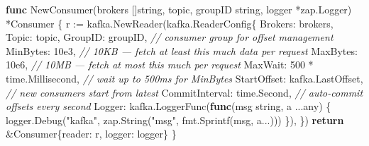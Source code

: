 \documentclass[
]{article}
\newenvironment{Shaded}{}{}
\newcommand{\CommentTok}[1]{\textcolor[rgb]{0.38,0.63,0.69}{\textit{#1}}}
\newcommand{\ControlFlowTok}[1]{\textcolor[rgb]{0.00,0.44,0.13}{\textbf{#1}}}
\newcommand{\DataTypeTok}[1]{\textcolor[rgb]{0.56,0.13,0.00}{#1}}
\newcommand{\DecValTok}[1]{\textcolor[rgb]{0.25,0.63,0.44}{#1}}
\newcommand{\FloatTok}[1]{\textcolor[rgb]{0.25,0.63,0.44}{#1}}
\newcommand{\KeywordTok}[1]{\textcolor[rgb]{0.00,0.44,0.13}{\textbf{#1}}}
\newcommand{\NormalTok}[1]{#1}
\newcommand{\OperatorTok}[1]{\textcolor[rgb]{0.40,0.40,0.40}{#1}}
\newcommand{\StringTok}[1]{\textcolor[rgb]{0.25,0.44,0.63}{#1}}
\begin{document}
\begin{Shaded}
\begin{Highlighting}[]
\KeywordTok{func}\NormalTok{ NewConsumer}\OperatorTok{(}\NormalTok{brokers }\OperatorTok{[]}\DataTypeTok{string}\OperatorTok{,}\NormalTok{ topic}\OperatorTok{,}\NormalTok{ groupID }\DataTypeTok{string}\OperatorTok{,}\NormalTok{ logger }\OperatorTok{*}\NormalTok{zap}\OperatorTok{.}\NormalTok{Logger}\OperatorTok{)} \OperatorTok{*}\NormalTok{Consumer }\OperatorTok{\{}
\NormalTok{    r }\OperatorTok{:=}\NormalTok{ kafka}\OperatorTok{.}\NormalTok{NewReader}\OperatorTok{(}\NormalTok{kafka}\OperatorTok{.}\NormalTok{ReaderConfig}\OperatorTok{\{}
\NormalTok{        Brokers}\OperatorTok{:}\NormalTok{     brokers}\OperatorTok{,}
\NormalTok{        Topic}\OperatorTok{:}\NormalTok{       topic}\OperatorTok{,}
\NormalTok{        GroupID}\OperatorTok{:}\NormalTok{     groupID}\OperatorTok{,}   \CommentTok{// consumer group for offset management}
\NormalTok{        MinBytes}\OperatorTok{:}    \FloatTok{10e3}\OperatorTok{,}      \CommentTok{// 10KB — fetch at least this much data per request}
\NormalTok{        MaxBytes}\OperatorTok{:}    \FloatTok{10e6}\OperatorTok{,}      \CommentTok{// 10MB — fetch at most this much per request}
\NormalTok{        MaxWait}\OperatorTok{:}     \DecValTok{500} \OperatorTok{*}\NormalTok{ time}\OperatorTok{.}\NormalTok{Millisecond}\OperatorTok{,} \CommentTok{// wait up to 500ms for MinBytes}
\NormalTok{        StartOffset}\OperatorTok{:}\NormalTok{ kafka}\OperatorTok{.}\NormalTok{LastOffset}\OperatorTok{,}       \CommentTok{// new consumers start from latest}
\NormalTok{        CommitInterval}\OperatorTok{:}\NormalTok{ time}\OperatorTok{.}\NormalTok{Second}\OperatorTok{,}         \CommentTok{// auto{-}commit offsets every second}
\NormalTok{        Logger}\OperatorTok{:}\NormalTok{ kafka}\OperatorTok{.}\NormalTok{LoggerFunc}\OperatorTok{(}\KeywordTok{func}\OperatorTok{(}\NormalTok{msg }\DataTypeTok{string}\OperatorTok{,}\NormalTok{ a }\OperatorTok{...}\NormalTok{any}\OperatorTok{)} \OperatorTok{\{}
\NormalTok{            logger}\OperatorTok{.}\NormalTok{Debug}\OperatorTok{(}\StringTok{"kafka"}\OperatorTok{,}\NormalTok{ zap}\OperatorTok{.}\NormalTok{String}\OperatorTok{(}\StringTok{"msg"}\OperatorTok{,}\NormalTok{ fmt}\OperatorTok{.}\NormalTok{Sprintf}\OperatorTok{(}\NormalTok{msg}\OperatorTok{,}\NormalTok{ a}\OperatorTok{...)))}
        \OperatorTok{\}),}
    \OperatorTok{\})}
    \ControlFlowTok{return} \OperatorTok{\&}\NormalTok{Consumer}\OperatorTok{\{}\NormalTok{reader}\OperatorTok{:}\NormalTok{ r}\OperatorTok{,}\NormalTok{ logger}\OperatorTok{:}\NormalTok{ logger}\OperatorTok{\}}
\OperatorTok{\}}


\end{Highlighting}
\end{Shaded}
\end{document}
